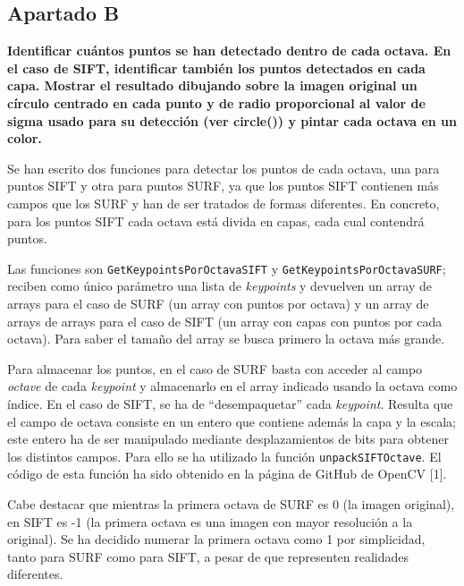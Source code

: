 \documentclass[12pt,spanish]{article} %
\begin{document}

\subsection{Apartado B}

\textbf{
Identificar cuántos puntos se han detectado dentro de cada octava. En el caso de SIFT, identificar también los puntos detectados en cada capa. Mostrar el resultado dibujando sobre la imagen original un círculo centrado en cada punto y de radio proporcional al valor de sigma usado para su detección (ver circle()) y pintar cada octava en un color.
}

Se han escrito dos funciones para detectar los puntos de cada octava, una para puntos SIFT y otra para puntos SURF, ya que los puntos SIFT contienen más campos que los SURF y han de ser tratados de formas diferentes. En concreto, para los puntos SIFT cada octava está divida en capas, cada cual contendrá puntos.

Las funciones son \texttt{GetKeypointsPorOctavaSIFT} y \texttt{GetKeypointsPorOctavaSURF}; reciben como único parámetro una lista de \textit{keypoints} y devuelven un array de arrays para el caso de SURF (un array con puntos por octava) y un array de arrays de arrays para el caso de SIFT (un array con capas con puntos por cada octava). Para saber el tamaño del array se busca primero la octava más grande.

Para almacenar los puntos, en el caso de SURF basta con acceder al campo \textit{octave} de cada \textit{keypoint} y almacenarlo en el array indicado usando la octava como índice. En el caso de SIFT, se ha de ``desempaquetar'' cada \textit{keypoint}. Resulta que el campo de octava consiste en un entero que contiene además la capa y la escala; este entero ha de ser manipulado mediante desplazamientos de bits para obtener los distintos campos. Para ello se ha utilizado la función \texttt{unpackSIFTOctave}. El código de esta función ha sido obtenido en la página de GitHub de OpenCV [1].

Cabe destacar que mientras la primera octava de SURF es 0 (la imagen original), en SIFT es -1 (la primera octava es una imagen con mayor resolución a la original). Se ha decidido numerar la primera octava como 1 por simplicidad, tanto para SURF como para SIFT, a pesar de que representen realidades diferentes.
\end{document}
